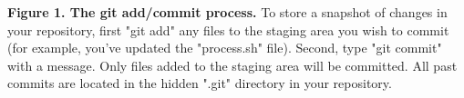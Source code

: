 \textbf{Figure 1. The git add/commit process.} To store a snapshot of changes in your repository, first "git add" any files to the staging area you wish to commit (for example, you've updated the "process.sh" file). Second, type "git commit" with a message. Only files added to the staging area will be committed. All past commits are located in the hidden ".git" directory in your repository. 